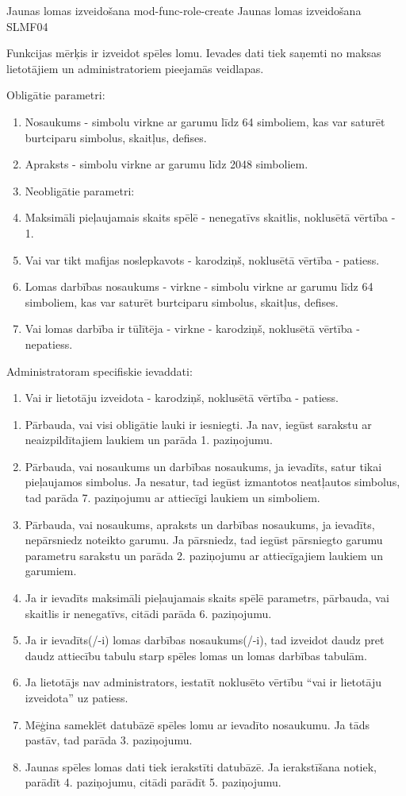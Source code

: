 \moduleFunctionTable
{Jaunas lomas izveidošana}
{mod-func-role-create}
{Jaunas lomas izveidošana}
{SLMF04}
{
	Funkcijas mērķis ir izveidot spēles lomu.
	Ievades dati tiek saņemti no maksas lietotājiem un administratoriem pieejamās veidlapas.

}
{
	Obligātie parametri:
	\begin{enumerate}
		\item Nosaukums - simbolu virkne ar garumu līdz 64 simboliem, kas var saturēt burtciparu simbolus, skaitļus, defises.
		\item Apraksts - simbolu virkne ar garumu līdz 2048 simboliem.
		\item Neobligātie parametri:
		\item Maksimāli pieļaujamais skaits spēlē - nenegatīvs skaitlis, noklusētā vērtība - 1.
		\item Vai var tikt mafijas noslepkavots - karodziņš, noklusētā vērtība - patiess.
		\item Lomas darbības nosaukums - virkne -  simbolu virkne ar garumu līdz 64 simboliem, kas var saturēt burtciparu simbolus, skaitļus, defises.
		\item Vai lomas darbība ir tūlītēja - virkne -  karodziņš, noklusētā vērtība - nepatiess.
	\end{enumerate}
	Administratoram specifiskie ievaddati:
	\begin{enumerate}
		\item Vai ir lietotāju izveidota - karodziņš, noklusētā vērtība - patiess.
	\end{enumerate}
}
{
	\begin{enumerate}
		\item Pārbauda, vai visi obligātie lauki ir iesniegti.
		      Ja nav, iegūst sarakstu ar neaizpildītajiem laukiem un parāda 1. paziņojumu.
		\item Pārbauda, vai nosaukums un darbības nosaukums, ja ievadīts, satur tikai pieļaujamos simbolus.
		      Ja nesatur, tad iegūst izmantotos neatļautos simbolus, tad parāda 7. paziņojumu ar attiecīgi laukiem un simboliem.
		\item Pārbauda, vai nosaukums, apraksts un darbības nosaukums, ja ievadīts, nepārsniedz noteikto garumu.
		      Ja pārsniedz, tad iegūst pārsniegto garumu parametru sarakstu un parāda 2. paziņojumu ar attiecīgajiem laukiem un garumiem.
		\item Ja ir ievadīts maksimāli pieļaujamais skaits spēlē parametrs, pārbauda, vai skaitlis ir nenegatīvs, citādi parāda 6. paziņojumu.
		\item Ja ir ievadīts(/-i) lomas darbības nosaukums(/-i), tad izveidot daudz pret daudz attiecību tabulu starp spēles lomas un lomas darbības tabulām.
		\item Ja lietotājs nav administrators, iestatīt noklusēto vērtību ``vai ir lietotāju izveidota'' uz patiess.
		\item Mēģina sameklēt datubāzē spēles lomu ar ievadīto nosaukumu.
		      Ja tāds pastāv, tad parāda 3. paziņojumu.
		\item Jaunas spēles lomas dati tiek ierakstīti datubāzē.
		      Ja ierakstīšana notiek, parādīt 4. paziņojumu, citādi parādīt 5. paziņojumu.
	\end{enumerate}
}
